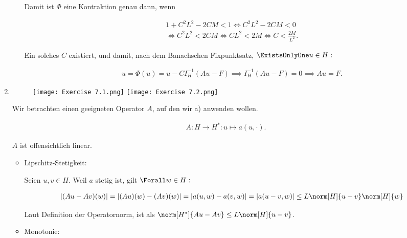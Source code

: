 \begin{solution}
\begin{enumerate}[label = \textbf{\alph*)}]
\begin{itemize}
    Damit ist $\Phi$ eine Kontraktion genau dann, wenn

    \begin{multline*}
      1 + C^2 L^2 - 2CM < 1
      \iff
      C^2 L^2 - 2CM < 0 \\
      \iff
      C^2 L^2 < 2CM
      \iff
      C L^2 < 2M
      \iff
      C < \frac{2M}{L^2}.
    \end{multline*}

    Ein solches $C$ existiert, und damit, nach dem Banachschen Fixpunktsatz, $\ExistsOnlyOne u \in H:$

    \begin{align*}
      u = \Phi(u) = u - C I_H^{-1}(Au - F)
      \implies
      I_H^{-1}(Au - F) = 0
      \implies
      Au = F.
    \end{align*}

  \end{itemize}

  \item \phantom{}
  
  \begin{figure}[h!]
    \centering
    \texttt{[image: Exercise 7.1.png]}
    \texttt{[image: Exercise 7.2.png]}
  \end{figure}

  Wir betrachten einen geeigneten Operator $A$, auf den wir a) anwenden wollen.

  \begin{align*}
    A:
    H \to H^\ast:
    u \mapsto a(u, \cdot).
  \end{align*}

  $A$ ist offensichtlich linear.

  \begin{itemize}

    \item Lipschitz-Stetigkeit:

    Seien $u, v \in H$.
    Weil $a$ stetig ist, gilt $\Forall w \in H:$

    \begin{align*}
      |(Au - Av)(w)|
      =
      |(Au)(w) - (Av)(w)|
      =
      |a(u, w) - a(v, w)|
      =
      |a(u - v, w)|
      \leq
      L \norm[H]{u - v} \norm[H]{w}
    \end{align*}

    Laut Definition der Operatornorm, ist als $\norm[H^\ast]{Au - Av} \leq L \norm[H]{u - v}$.

    \item Monotonie:


\end{itemize}
\end{enumerate}
\end{solution}
